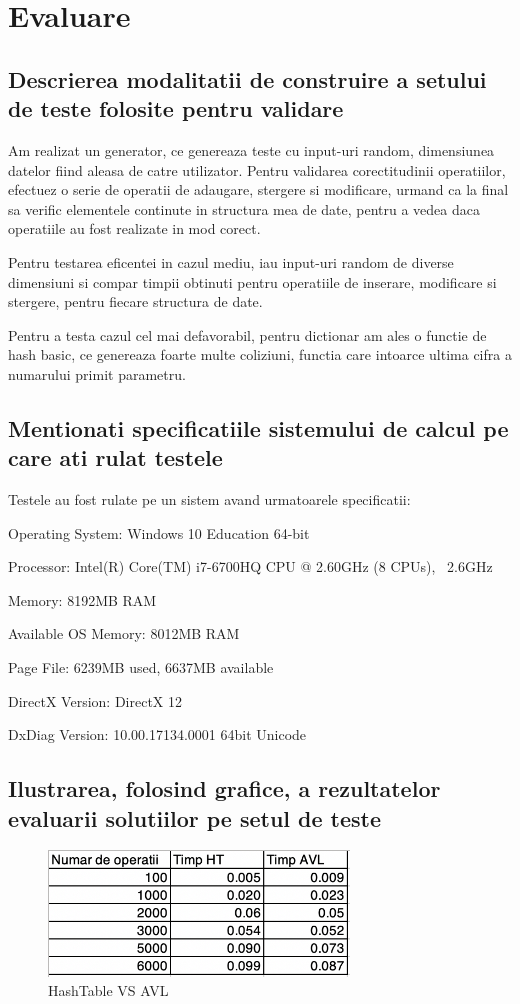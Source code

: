 \documentclass[runningheads]{llncs}
\begin{document}
\section{Evaluare}
\subsection{Descrierea modalitatii de construire a setului de teste folosite pentru validare}
Am realizat un generator, ce genereaza teste cu input-uri random, dimensiunea datelor fiind aleasa de catre utilizator. Pentru validarea corectitudinii operatiilor, efectuez o serie de operatii de adaugare, stergere si modificare, urmand ca la final sa verific elementele continute in structura mea de date, pentru a vedea daca operatiile au fost realizate in mod corect. 

Pentru testarea eficentei in cazul mediu, iau input-uri random de diverse dimensiuni si compar timpii obtinuti pentru operatiile de inserare, modificare si stergere, pentru fiecare structura de date.

Pentru a testa cazul cel mai defavorabil, pentru dictionar am ales o functie de hash basic, ce genereaza foarte multe coliziuni, functia care intoarce ultima cifra a numarului primit parametru. 


\subsection{Mentionati specificatiile sistemului de calcul pe care ati rulat testele}
Testele au fost rulate pe un sistem avand urmatoarele specificatii:

Operating System: Windows 10 Education 64-bit 

Processor: Intel(R) Core(TM) i7-6700HQ CPU @ 2.60GHz (8 CPUs), ~2.6GHz

Memory: 8192MB RAM

Available OS Memory: 8012MB RAM

Page File: 6239MB used, 6637MB available

DirectX Version: DirectX 12

DxDiag Version: 10.00.17134.0001 64bit Unicode

\subsection{Ilustrarea, folosind grafice, a rezultatelor evaluarii solutiilor pe setul de teste}

\begin{figure}[ht!]
\centering
\includegraphics[width=80mm]{8.png}
\caption{HashTable VS AVL \label{overflow}}
\end{figure}
\end{document}
